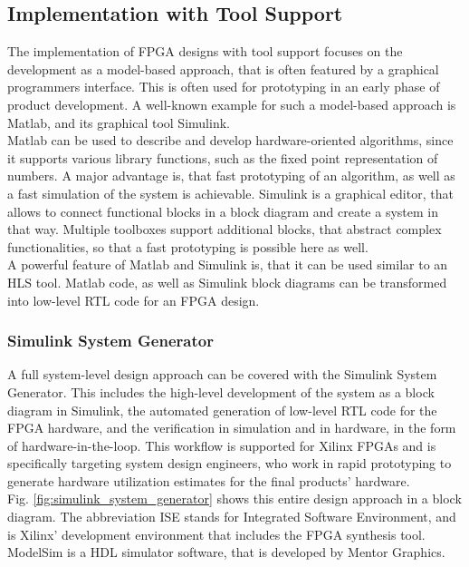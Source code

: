 \subsection{Implementation with Tool Support}

The implementation of FPGA designs with tool support focuses on the development as a model-based approach, that is often featured by a graphical programmers interface.
This is often used for prototyping in an early phase of product development.
A well-known example for such a model-based approach is Matlab, and its graphical tool Simulink.\\

Matlab can be used to describe and develop hardware-oriented algorithms, since it supports various library functions, such as the fixed point representation of numbers.
A major advantage is, that fast prototyping of an algorithm, as well as a fast simulation of the system is achievable.
Simulink is a graphical editor, that allows to connect functional blocks in a block diagram and create a system in that way.
Multiple toolboxes support additional blocks, that abstract complex functionalities, so that a fast prototyping is possible here as well.\\

A powerful feature of Matlab and Simulink is, that it can be used similar to an HLS tool.
Matlab code, as well as Simulink block diagrams can be transformed into low-level RTL code for an FPGA design.

\subsubsection{Simulink System Generator}

A full system-level design approach can be covered with the Simulink System Generator.
This includes the high-level development of the system as a block diagram in Simulink, the automated generation of low-level RTL code for the FPGA hardware, and the verification in simulation and in hardware, in the form of hardware-in-the-loop.
This workflow is supported for Xilinx FPGAs and is specifically targeting system design engineers, who work in rapid prototyping to generate hardware utilization estimates for the final products' hardware.\\

Fig. \ref{fig:simulink_system_generator} shows this entire design approach in a block diagram.
The abbreviation ISE stands for Integrated Software Environment, and is Xilinx' development environment that includes the FPGA synthesis tool.
ModelSim is a HDL simulator software, that is developed by Mentor Graphics.

